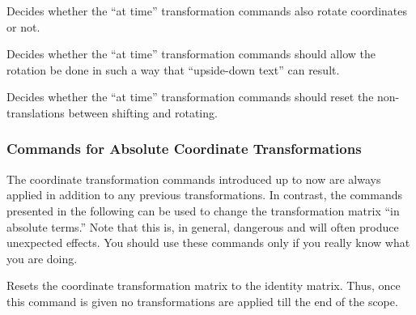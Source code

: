 {
    \let\ifpgfslopedattime=\relax
    \begin{textoken}{\ifpgfslopedattime}
        Decides whether the ``at time'' transformation commands also rotate
        coordinates or not.
    \end{textoken}
}
{
    \let\ifpgfallowupsidedowattime=\relax
    \begin{textoken}{\ifpgfallowupsidedowattime}
        Decides whether the ``at time'' transformation commands should allow
        the rotation be done in such a way that ``upside-down text'' can
        result.
    \end{textoken}
}
{
    \let\ifpgfresetnontranslationsattime=\relax
    \begin{textoken}{\ifpgfresetnontranslationsattime}
        Decides whether the ``at time'' transformation commands should reset
        the non-translations between shifting and rotating.
    \end{textoken}
}


\subsubsection{Commands for Absolute Coordinate Transformations}

The coordinate transformation commands introduced up to now are always applied
in addition to any previous transformations. In contrast, the commands
presented in the following can be used to change the transformation matrix ``in
absolute terms.'' Note that this is, in general, dangerous and will often
produce unexpected effects. You should use these commands only if you really
know what you are doing.

\begin{command}{\pgftransformreset}
    Resets the coordinate transformation matrix to the identity matrix. Thus,
    once this command is given no transformations are applied till the end of
    the scope.
\begin{codeexample}[]
\end{codeexample}
\end{command}

